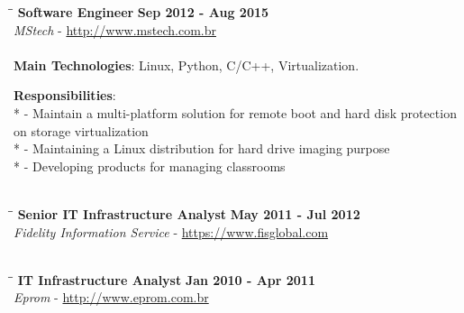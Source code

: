 \documentclass[margin]{res}
\begin{document}
\begin{resume}
\vspace{-0.1in}
\begin{tabbing}
  \hspace{2.3in}\= \hspace{1.7in}\= \kill %
  \textbf{Software Engineer}    \>\>\textbf{Sep 2012 - Aug 2015}\\
  \textit{MStech} - \url{http://www.mstech.com.br}\\\\
  \textbf{Main Technologies}: Linux, Python, C/C++, Virtualization.
\end{tabbing}\vspace{-20pt}      %
\vspace{2mm}\textbf{Responsibilities}: \\*
  - Maintain a multi-platform solution for remote boot and hard disk protection
on storage virtualization \\*
  - Maintaining a Linux distribution for hard drive imaging purpose \\*
  - Developing products for managing classrooms\\
  \\

\vspace{-0.1in}
\begin{tabbing}
  \hspace{2.3in}\= \hspace{1.7in}\= \kill %
  \textbf{Senior IT Infrastructure Analyst}    \>\>\textbf{May 2011 - Jul 2012}\\
  \textit{Fidelity Information Service} - \url{https://www.fisglobal.com}\\\\
\end{tabbing}\vspace{-20pt}      %


\vspace{-0.1in}
\begin{tabbing}
  \hspace{2.3in}\= \hspace{1.7in}\= \kill %
  \textbf{IT Infrastructure Analyst}    \>\>\textbf{Jan 2010 - Apr 2011}\\
  \textit{Eprom} - \url{http://www.eprom.com.br}\\\\
\end{tabbing}\vspace{-20pt}      %



\end{resume}
\end{document}
